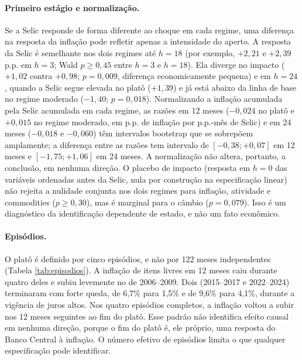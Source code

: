 \documentclass[12pt,a4paper]{article}
\begin{document}
\paragraph{Primeiro estágio e normalização.} Se a Selic responde de forma diferente ao choque em cada regime, uma diferença na resposta da inflação pode refletir apenas a intensidade do aperto. A resposta da Selic é semelhante nos dois regimes até $h = 18$ (por exemplo, $+2{,}21$ e $+2{,}39$ p.p. em $h = 3$; Wald $p \ge 0{,}45$ entre $h = 3$ e $h = 18$). Ela diverge no impacto ($+1{,}02$ contra $+0{,}98$; $p = 0{,}009$, diferença economicamente pequena) e em $h = 24$, quando a Selic segue elevada no platô ($+1{,}39$) e já está abaixo da linha de base no regime moderado ($-1{,}40$; $p = 0{,}018$). Normalizando a inflação acumulada pela Selic acumulada em cada regime, as razões em 12 meses ($-0{,}024$ no platô e $+0{,}015$ no regime moderado, em p.p. de inflação por p.p.-mês de Selic) e em 24 meses ($-0{,}018$ e $-0{,}060$) têm intervalos bootstrap que se sobrepõem amplamente; a diferença entre as razões tem intervalo de $[-0{,}38; +0{,}07]$ em 12 meses e $[-1{,}75; +1{,}06]$ em 24 meses. A normalização não altera, portanto, a conclusão, em nenhuma direção. O placebo de impacto (resposta em $h = 0$ das variáveis ordenadas antes da Selic, nula por construção na especificação linear) não rejeita a nulidade conjunta nos dois regimes para inflação, atividade e commodities ($p \ge 0{,}30$), mas é marginal para o câmbio ($p = 0{,}079$). Isso é um diagnóstico da identificação dependente de estado, e não um fato econômico.

\paragraph{Episódios.} O platô é definido por cinco episódios, e não por 122 meses independentes (Tabela \ref{tab:episodios}). A inflação de itens livres em 12 meses caiu durante quatro deles e subiu levemente no de 2006--2009. Dois (2015--2017 e 2022--2024) terminaram com forte queda, de 6,7\% para 1,5\% e de 9,6\% para 4,1\%, durante a vigência de juros altos. Nos quatro episódios completos, a inflação voltou a subir nos 12 meses seguintes ao fim do platô. Esse padrão não identifica efeito causal em nenhuma direção, porque o fim do platô é, ele próprio, uma resposta do Banco Central à inflação. O número efetivo de episódios limita o que qualquer especificação pode identificar.
\end{document}
